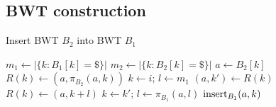 \documentclass[webpdf,contemporary,large,namedate]{oup-authoring-template}%
\begin{document}


\subsection{BWT construction}

\begin{algorithm}[bt]
	\caption{Insert BWT $B_2$ into BWT $B_1$}\label{algo:merge}
	\begin{algorithmic}[1]
			\State $m_1\gets|\{k:B_1[k]=\$\}|$
			\State $m_2\gets|\{k:B_2[k]=\$\}|$
				\State $a\gets B_2[k]$
				\State $R(k)\gets (a,\pi_{B_2}(a,k))$
			\EndFor
				\State $k\gets i$; $l\gets m_1$
				\Repeat
					\State $(a,k')\gets R(k)$
					\State $R(k)\gets(a,k+l)$
					\State $k\gets k'$; $l\gets \pi_{B_1}(a,l)$
			\EndFor
				\State ${\rm insert}_{B_1}(a,k)$
			\EndFor
		\EndProcedure
	\end{algorithmic}
\end{algorithm}
\end{document}

